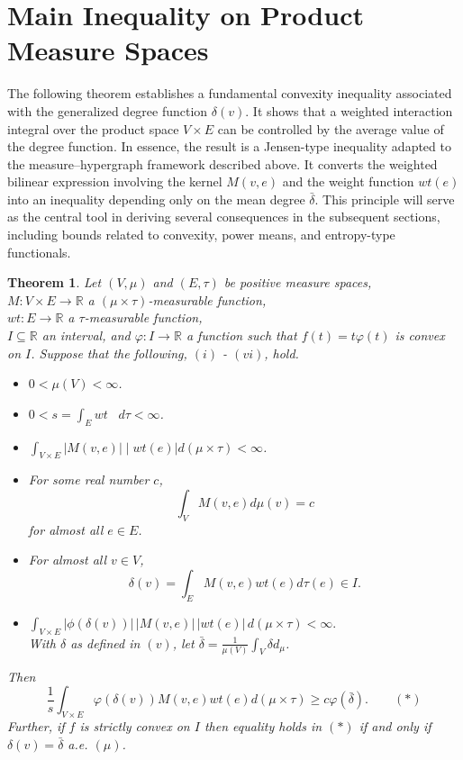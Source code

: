 \documentclass[final,1p,times]{elsarticle}
\newtheorem{thm}{Theorem}[section]
\begin{document}
\section{Main Inequality on Product Measure Spaces}
The following theorem establishes a fundamental convexity inequality associated with the generalized degree function $\delta(v)$.  
It shows that a weighted interaction integral over the product space $V\times E$ can be controlled by the average value of the degree function.   In essence, the result is a Jensen-type inequality adapted to the measure–hypergraph framework described above.  It converts the weighted bilinear expression involving the kernel $M(v,e)$ and the weight function $wt(e)$ into an inequality depending only on the mean degree $\bar\delta$.  
This principle will serve as the central tool in deriving several consequences in the subsequent sections, including bounds related to convexity, power means, and entropy-type functionals.
\begin{thm}  \label {t3}
Let $(V, \mu)$ and $(E, \tau)$ be positive measure spaces,\\
$M: V \times E \to \mathbb {R}$ a  $(\mu \times \tau)$-measurable function,\\
$wt: E \to \mathbb {R}$ a $\tau$-measurable function,\\
$I \subseteq \mathbb {R}$ an interval, and $\varphi: I \to \mathbb {R}$ a function such that $f(t) = t \varphi (t)$ is convex on $I$.  Suppose that the following, $(i)$ - $(vi)$, hold.

\begin{itemize}
\item [(i)] $0 < \mu (V) < \infty$.
\item [(ii)] $0 < s = \int _E wt \;\;\; d \tau < \infty$.
\item [(iii)] $\int _{V \times E} |M (v, e)| \mid wt (e)| d(\mu \times \tau) < \infty$.
\item [(iv)] For some real number $c$,
$$
\int _V M(v, e) d \mu (v) = c
$$
for almost all $e \in E$.
\item [(v)] For almost all $v \in V$, 
$$
\delta (v) = \int _E M(v, e) wt(e) d \tau (e) \in I.
$$
\item [(vi)] $ \int_{V\times E} |\phi(\delta(v))|\,|M(v,e)|\,|wt(e)|\, d(\mu\times\tau) < \infty.$\\[.1in]
With $\delta$ as defined in $(v)$, let $\bar {\delta} = \frac {1}{\mu (V)} \int _V \delta d_{\mu}$.
\end{itemize}
Then
$$  
\frac {1}{s} \int _{V \times E} \varphi (\delta (v)) M(v, e)  wt(e)  d(\mu \times \tau) \geq c \varphi (\bar {\delta}).  \qquad (*)
$$
Further, if $f$ is strictly convex on $I$ then equality holds in $(*)$ if and only if $\delta (v) = \bar {\delta}$ a.e. $(\mu)$.
\end{thm}
\end{document}
